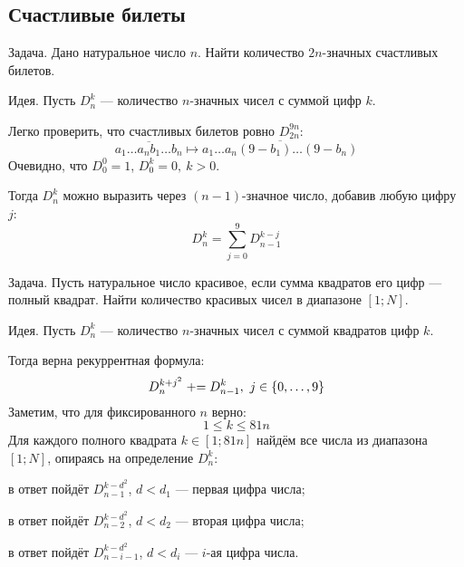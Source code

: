 \newpage
\subsection{Счастливые билеты}

\begin{theorem}
{\bold Задача.} Дано натуральное число $n$. Найти количество $2n$-значных счастливых билетов.
\end{theorem}

{\bold Идея.} Пусть $D_n^k$ --- количество $n$-значных чисел с суммой цифр $k$.

Легко проверить, что счастливых билетов ровно $D_{2n}^{9n}$:
$$\overline{a_1\dots a_nb_1\dots b_n}\mapsto\overline{a_1\dots a_n(9-b_1)\dots(9-b_n)}$$
Очевидно, что $D_0^0=1$, $D_0^{k}=0,\ k\greater 0$.

Тогда $D_n^k$ можно выразить через $(n-1)$-значное число, добавив любую цифру $j$:
$$D_n^k=\sum_{j=0}^9D_{n-1}^{k-j}$$
\begin{theorem}
{\bold Задача.} Пусть натуральное число {\ital красивое}, если сумма квадратов его цифр --- полный квадрат. Найти количество красивых чисел в диапазоне $[1;N]$.
\end{theorem}

{\bold Идея.} Пусть $D_n^k$ --- количество $n$-значных чисел с суммой квадратов цифр $k$.

Тогда верна рекуррентная формула:
$$D_{n}^{k+j^2}\pluseq D_{n-1}^k,\ j\in\{0,\dots,9\}$$
Заметим, что для фиксированного $n$ верно:
$$1\leq k\leq 81n$$
Для каждого {\ital полного квадрата} $k\in[1;81n]$ найдём все числа из диапазона $[1;N]$, опираясь на определение $D_n^k$:
\begin{list*}
\item в ответ пойдёт $D_{n-1}^{k-d^2}$, $d\less d_1$ --- первая цифра числа;
\item в ответ пойдёт $D_{n-2}^{k-d^2}$, $d\less d_2$ --- вторая цифра числа;
\item в ответ пойдёт $D_{n-i-1}^{k-d^2}$, $d\less d_i$ --- $i$-ая цифра числа.
\end{list*}

